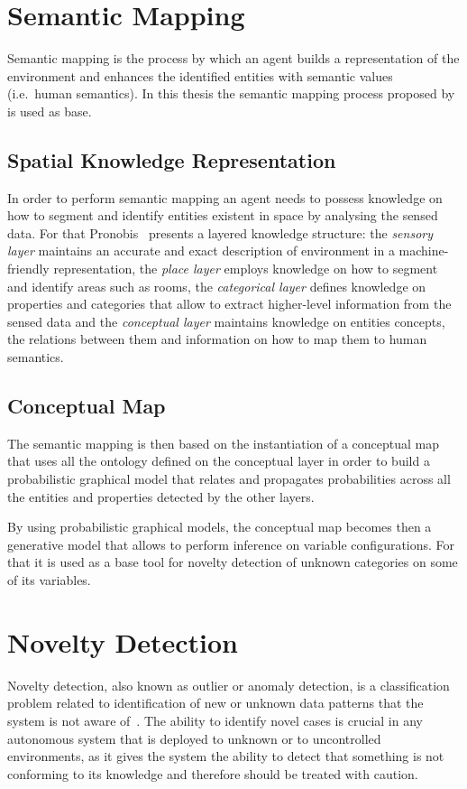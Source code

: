\documentclass[9pt,a4paper]{extarticle}
\begin{document}
\begin{multicols}{2}
\section{Semantic Mapping}
Semantic mapping is the process by which an agent builds a representation of the environment and
enhances the identified entities with semantic values (i.e.\ human semantics).
In this thesis the semantic mapping process proposed by \cite{pronobis2011phd} is used as base.

\subsection{Spatial Knowledge Representation}
In order to perform semantic mapping an agent needs to possess knowledge on how to segment and
identify entities existent in space by analysing the sensed data. For that
Pronobis~\cite{pronobis2011semmap} presents a layered knowledge structure:
the \emph{sensory layer} maintains an accurate and exact description of environment in a machine-friendly representation,
the \emph{place layer} employs knowledge on how to segment and identify areas such as rooms,
the \emph{categorical layer} defines knowledge on properties and categories that allow to extract
higher-level information from the sensed data
and the \emph{conceptual layer} maintains knowledge on entities concepts, the relations between them
and information on how to map them to human semantics.

\subsection{Conceptual Map}
The semantic mapping is then based on the instantiation of a conceptual map that uses all the
ontology defined on the conceptual layer in order to build a probabilistic graphical model that
relates and propagates probabilities across all the entities and properties detected by the
other layers.

By using probabilistic graphical models, the conceptual map becomes then a generative model that
allows to perform inference on variable configurations. For that it is used as a base tool
for novelty detection of unknown categories on some of its variables.

\section{Novelty Detection}
Novelty detection, also known as outlier or anomaly detection, is a
classification problem related to identification of new or unknown data
patterns that the system is not aware of~\cite{markou2003novelty}.
The ability to identify novel cases is crucial in any autonomous system
that is deployed to unknown or to uncontrolled environments, as it gives the
system the ability to detect that something is not conforming to its knowledge and
therefore should be treated with caution.


\end{multicols}
\end{document}
